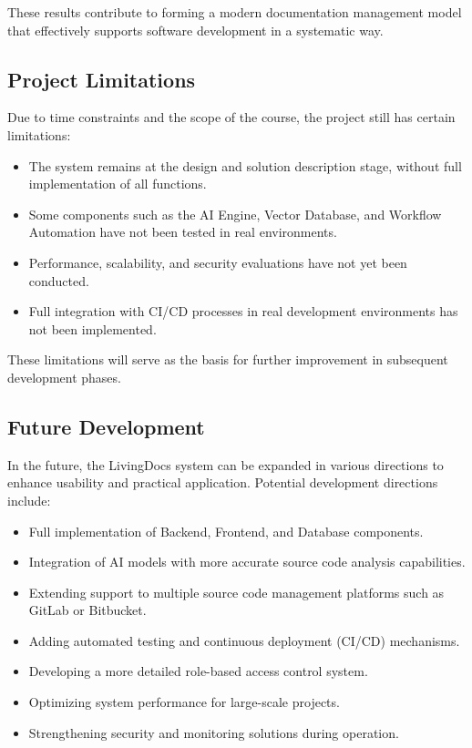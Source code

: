 These results contribute to forming a modern documentation management model that effectively supports software development in a systematic way.

\subsection{Project Limitations}
Due to time constraints and the scope of the course, the project still has certain limitations:
\begin{itemize}
    \item The system remains at the design and solution description stage, without full implementation of all functions.
    \item Some components such as the AI Engine, Vector Database, and Workflow Automation have not been tested in real environments.
    \item Performance, scalability, and security evaluations have not yet been conducted.
    \item Full integration with CI/CD processes in real development environments has not been implemented.
\end{itemize}

These limitations will serve as the basis for further improvement in subsequent development phases.

\subsection{Future Development}
In the future, the LivingDocs system can be expanded in various directions to enhance usability and practical application. Potential development directions include:
\begin{itemize}
    \item Full implementation of Backend, Frontend, and Database components.
    \item Integration of AI models with more accurate source code analysis capabilities.
    \item Extending support to multiple source code management platforms such as GitLab or Bitbucket.
    \item Adding automated testing and continuous deployment (CI/CD) mechanisms.
    \item Developing a more detailed role-based access control system.
    \item Optimizing system performance for large-scale projects.
    \item Strengthening security and monitoring solutions during operation.
\end{itemize}

